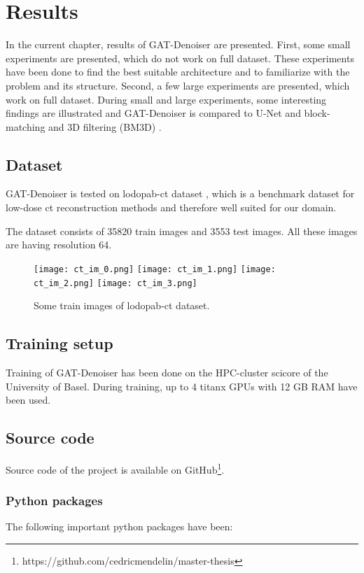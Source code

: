 \chapter{Results}
\label{sec:results}

In the current chapter, results of GAT-Denoiser are presented.
First, some small experiments are presented, which do not work on full dataset.
These experiments have been done to find the best suitable architecture and to 
familiarize with the problem and its structure.
Second, a few large experiments are presented, which work on full dataset.
During small and large experiments, some interesting findings are illustrated and GAT-Denoiser
is compared to U-Net and block-matching and 3D filtering (BM3D) \cite{bm3d}.


\section{Dataset}
GAT-Denoiser is tested on lodopab-ct dataset \cite{lodopab-dataset}, which is a 
benchmark dataset for low-dose ct reconstruction methods and therefore well suited for our domain.

The dataset consists of 35820 train images and 3553 test images.
All these images are having resolution 64.

\begin{figure}[H]
  \centering
  \hfill
  \texttt{[image: ct\_im\_0.png]}
  \hfill
  \texttt{[image: ct\_im\_1.png]}
  \hfill
  \texttt{[image: ct\_im\_2.png]}
  \hfill
  \texttt{[image: ct\_im\_3.png]}
  \hfill
  \caption{Some train images of lodopab-ct dataset.}
\end{figure}



\section{Training setup}
Training of GAT-Denoiser has been done on the HPC-cluster scicore of the University of Basel.
During training, up to 4 titanx GPUs with 12 GB RAM have been used.


\section{Source code}
Source code of the project is available on GitHub\footnote{https://github.com/cedricmendelin/master-thesis}.

\subsection{Python packages}
The following important python packages have been:


